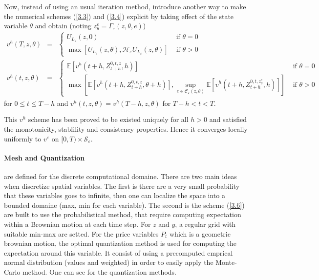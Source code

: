 \documentclass[a4paper,10pt]{article}
\begin{document}
\par Now, instead of using an usual iteration method, \cite{GMP} introduce another way to make the numerical schemes (\ref{3.3}) and (\ref{3.4}) explicit by taking effect of the state variable $\theta$ and obtain (noting $z^e_\theta = \Gamma_\varepsilon (z, \theta, e)$)
\begin{eqnarray}
\label{3.5}
{v^h}(T,z,\theta ) &=& 
\left\{ \begin{array}{ll}
{U_{{L_\varepsilon }}}\left( {z,0} \right) & \text{ if } \theta = 0 \\
\max \left[ {{U_{{L_\varepsilon }}}\left( {z,\theta } \right),{\mathcal{H}_\varepsilon }{U_{{L_\varepsilon }}}\left( {z,\theta } \right)} \right] & \text{ if } \theta > 0
\end{array} \right.
\\
\label{3.6}
{v^h}(t,z,\theta ) &=& 
\left\{ \begin{array}{ll}
\scriptstyle
\mathbb{E}\left[ {{v^h}\left( {t + h,Z_{t + h}^{0,t,z},h} \right)} \right] & \text{ if } \theta = 0\\
\scriptstyle
\max \left[ {\mathbb{E}\left[ {{v^h}\left( {t + h,Z_{t + h}^{0,t,z},\theta  + h} \right)} \right],\mathop {\sup }\limits_{e \in {\mathcal{C}_\varepsilon }\left( {z,\theta } \right)} \mathbb{E}\left[ {{v^h}\left( {t + h,Z_{t + h}^{0,t,z_\theta ^e},h} \right)} \right]} \right] & \text{ if } \theta > 0
\end{array} \right.
\end{eqnarray}
for $0 \le t \le T-h$ and $v^h(t,z,\theta) = v^h(T-h,z,\theta) $ for $T-h < t < T$.

\par This $v^h$ scheme has been proved to be existed uniquely for all $h > 0$ and satisfied the monotonicity, stablility and consistency properties. Hence it converges locally uniformly to $v^\varepsilon$ on $[0, T) \times \mathcal{S}_{\varepsilon}$.

\paragraph{Mesh and Quantization} are defined for the discrete computational domaine. There are two main ideas when discretize spatial variables. The first is there are a very small probability that these variables goes to infinite, then one can localize the space into a bounded domaine (max, min for each variable). The second is the scheme (\ref{3.6}) are built to use the probabilistical method, that require computing expectation within a Brownian motion at each time step. For $z$ and $y$, a regular grid with suitable min-max are setted. For the price variables $P_t$ which is a geometric brownian motion, the optimal quantization method is used for computing the expectation around this variable. It consist of using a precomputed emprical normal distribution (values and weighted) in order to easily apply the Monte-Carlo method. One can see \cite{GP}\cite{GPHP} for the quantization methods.    
\end{document}
